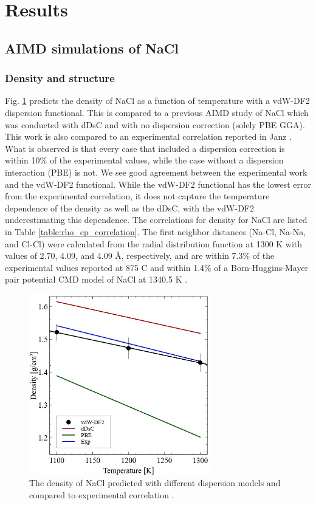 \documentclass[review]{elsarticle}
\begin{document}
\section{Results}

\subsection{AIMD simulations of NaCl}
\subsubsection{Density and structure}

Fig. \ref{fig:NaCl_density} predicts the density of NaCl as a function of temperature with a vdW-DF2 dispersion functional. This is compared to a previous AIMD study of NaCl \cite{ANDERSSON2022153836} which was conducted with dDsC and with no dispersion correction (solely PBE GGA). This work is also compared to an experimental correlation reported in Janz \cite{janz1988thermodynamic}. What is observed is that every case that included a dispersion correction is within 10\% of the experimental values, while the case without a dispersion interaction (PBE) is not. We see good agreement between the experimental work and the vdW-DF2 functional. While the vdW-DF2 functional has the lowest error from the experimental correlation, it does not capture the temperature dependence of the density as well as the dDsC, with the vdW-DF2 underestimating this dependence. The correlations for density for NaCl are listed in Table \ref{table:rho_cp_correlation}. The first neighbor distances (Na-Cl, Na-Na, and Cl-Cl) were calculated from the radial distribution function at 1300 K with values of 2.70, 4.09, and 4.09 {\AA}, respectively, and are within 7.3\% of the experimental values reported at 875 \degree C \cite{edwards1975structure} and within 1.4\% of a Born-Huggins-Mayer pair potential  CMD model of NaCl at 1340.5 K \cite{lantelme1974application}. 

\begin{figure}[h!]
 \centering
 \includegraphics[width=0.7\textwidth]{NaCl-density.jpg} 
 \caption{The density of NaCl predicted with different dispersion models\cite{ANDERSSON2022153836} and compared to experimental correlation \cite{janz1988thermodynamic}.}
 \label{fig:NaCl_density}
\end{figure}
\end{document}

